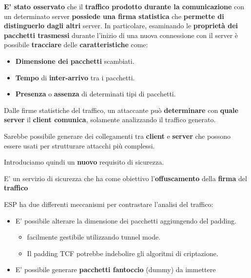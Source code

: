 \begin{note}
\textbf{E' stato osservato} che il \textbf{traffico prodotto durante la comunicazione} con un determinato server \textbf{possiede una firma statistica} che \textbf{permette di distinguerlo dagli altri} server. In particolare, esaminando le \textbf{proprietà dei pacchetti trasmessi} durante l’inizio di una nuova connessione con il server è possibile \textbf{tracciare} delle \textbf{caratteristiche} come:
\begin{itemize}
    \item \textbf{Dimensione dei pacchetti} scambiati.
    \item \textbf{Tempo} di  \textbf{inter-arrivo} tra i pacchetti.
    \item \textbf{Presenza} o \textbf{assenza} di determinati tipi di pacchetti.
\end{itemize}
\end{note}
Dalle firme statistiche del traffico, un attaccante può \textbf{determinare} con \textbf{quale server} il \textbf{client comunica}, solamente analizzando il traffico generato. \\
\begin{remark}
Sarebbe possibile generare dei collegamenti tra \textbf{client} e \textbf{server} che possono essere usati per strutturare attacchi più complessi.
\end{remark}
Introduciamo quindi un \textbf{nuovo} requisito di sicurezza.
\begin{definition}\label{def:trafflow}
E' un servizio di sicurezza che ha come obiettivo l'\textbf{offuscamento} della \textbf{firma} del \textbf{traffico}
\end{definition} 
ESP ha due differenti meccanismi per contrastare l'analisi del traffico:
\begin{proposition}
\begin{itemize}
    \item E' possibile alterare la dimensione dei pacchetti aggiungendo del padding. 
    \begin{itemize}
        \item [\textcolor{green}{\checkmark}] facilmente gestibile utilizzando tunnel mode.
        \item [\textcolor{red}{\ding{55}}] Il padding TCF potrebbe indebolire gli algoritmi di criptazione.
    \end{itemize}
    \item E' possibile generare \textbf{pacchetti fantoccio} (dummy) da immettere 
\end{itemize}
\end{proposition}
